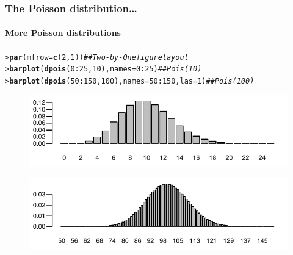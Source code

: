\documentclass{beamer}\usepackage[]{graphicx}\usepackage[]{xcolor}
\makeatletter
\newcommand{\hlnum}[1]{\textcolor[rgb]{0.686,0.059,0.569}{#1}}%
\newcommand{\hlcom}[1]{\textcolor[rgb]{0.678,0.584,0.686}{\textit{#1}}}%
\newcommand{\hlopt}[1]{\textcolor[rgb]{0,0,0}{#1}}%
\newcommand{\hlstd}[1]{\textcolor[rgb]{0.345,0.345,0.345}{#1}}%
\newcommand{\hlkwc}[1]{\textcolor[rgb]{0.333,0.667,0.333}{#1}}%
\newcommand{\hlkwd}[1]{\textcolor[rgb]{0.737,0.353,0.396}{\textbf{#1}}}%
\newenvironment{kframe}{%
 \def\at@end@of@kframe{}%
 \ifinner\ifhmode%
  \def\at@end@of@kframe{\end{minipage}}%
  \begin{minipage}{\columnwidth}%
 \fi\fi%
 \def\FrameCommand##1{\hskip\@totalleftmargin \hskip-\fboxsep
 \colorbox{shadecolor}{##1}\hskip-\fboxsep
     \hskip-\linewidth \hskip-\@totalleftmargin \hskip\columnwidth}%
 \MakeFramed {\advance\hsize-\width
   \@totalleftmargin\z@ \linewidth\hsize
   \@setminipage}}%
 {\par\unskip\endMakeFramed%
 \at@end@of@kframe}
\newenvironment{knitrout}{}{} %
\makeatother
\begin{document}
\begin{frame}[fragile]
\frametitle{The Poisson distribution\ldots}
\framesubtitle{More Poisson distributions}

\begin{knitrout}\scriptsize
{}\color{fgcolor}\begin{kframe}
\begin{alltt}
\hlstd{> }\hlkwd{par}\hlstd{(}\hlkwc{mfrow}\hlstd{=}\hlkwd{c}\hlstd{(}\hlnum{2}\hlstd{,}\hlnum{1}\hlstd{))} \hlcom{## Two-by-One figure layout}
\hlstd{> }\hlkwd{barplot}\hlstd{(}\hlkwd{dpois}\hlstd{(}\hlnum{0}\hlopt{:}\hlnum{25}\hlstd{,}\hlnum{10}\hlstd{),}\hlkwc{names}\hlstd{=}\hlnum{0}\hlopt{:}\hlnum{25}\hlstd{)} \hlcom{## Pois(10)}
\hlstd{> }\hlkwd{barplot}\hlstd{(}\hlkwd{dpois}\hlstd{(}\hlnum{50}\hlopt{:}\hlnum{150}\hlstd{,}\hlnum{100}\hlstd{),}\hlkwc{names}\hlstd{=}\hlnum{50}\hlopt{:}\hlnum{150}\hlstd{,}\hlkwc{las}\hlstd{=}\hlnum{1}\hlstd{)} \hlcom{## Pois(100)}
\end{alltt}
\end{kframe}
\end{knitrout}



\begin{figure}
  \centering
  \includegraphics{figure/RC-H13-018A}
\end{figure}

\begin{figure}
  \centering
  \includegraphics{figure/RC-H13-018B}
\end{figure}

\end{frame}
\end{document}
